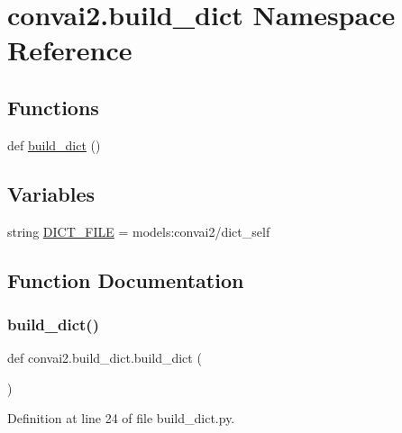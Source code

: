 \hypertarget{namespaceconvai2_1_1build__dict}{}\section{convai2.\+build\+\_\+dict Namespace Reference}
\label{namespaceconvai2_1_1build__dict}
\subsection*{Functions}
\begin{DoxyCompactItemize}
\item 
def \hyperlink{namespaceconvai2_1_1build__dict_a2c927edbaf6ce4c2451ceb21e8f822e7}{build\+\_\+dict} ()
\end{DoxyCompactItemize}
\subsection*{Variables}
\begin{DoxyCompactItemize}
\item 
string \hyperlink{namespaceconvai2_1_1build__dict_ab60da44aada182642c6a9d8d273479d3}{D\+I\+C\+T\+\_\+\+F\+I\+LE} = \textquotesingle{}models\+:convai2/dict\+\_\+self\textquotesingle{}
\end{DoxyCompactItemize}


\subsection{Function Documentation}
\mbox{\label{namespaceconvai2_1_1build__dict_a2c927edbaf6ce4c2451ceb21e8f822e7}} 
\subsubsection{\texorpdfstring{build\+\_\+dict()}{build\_dict()}}
{\footnotesize\ttfamily def convai2.\+build\+\_\+dict.\+build\+\_\+dict (\begin{DoxyParamCaption}{ }\end{DoxyParamCaption})}



Definition at line 24 of file build\+\_\+dict.\+py.



